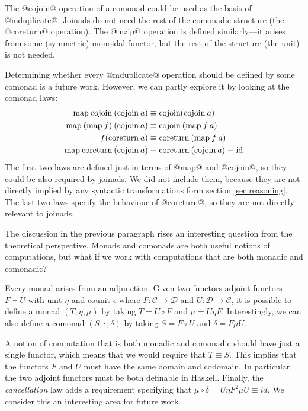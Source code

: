 \documentclass[preprint]{sigplanconf}
\begin{document}
The @cojoin@ operation of a comonad could be used as the basis of @mduplicate@. Joinads do not 
need the rest of the comonadic structure (the @coreturn@ operation). The @mzip@ operation is 
defined similarly---it arises from some (symmetric) monoidal functor, but the rest of the structure 
(the unit) is not needed. 

Determining whether every @mduplicate@ operation should be defined by some comonad is a future
work. However, we can partly explore it by looking at the comonad laws:
\begin{align*}
\text{map} \: \text{cojoin} \: (\text{cojoin} \: a) &\equiv \text{cojoin} (\text{cojoin} \: a)\\
\text{map} \: (\text{map} \: f) \: (\text{cojoin} \: a) &\equiv \text{cojoin} \: (\text{map} \: f \: a)\\
f (\text{coreturn} \: a) &\equiv \text{coreturn} \: (\text{map} \: f \: a)\\
\text{map} \: \text{coreturn} \: (\text{cojoin} \: a) &\equiv \text{coreturn} \: (\text{cojoin} \: a) \equiv \text{id}
\end{align*}
The first two laws are defined just in terms of @map@ and @cojoin@, so they could be also required 
by joinads. We did not include them, because they are not directly implied by any syntactic 
transformations form section \ref{sec:reasoning}. The last two laws specify the behaviour of 
@coreturn@, so they are not directly relevant to joinads.

The discussion in the previous paragraph rises an interesting question from the theoretical 
perspective. Monads and comonads are both useful notions of computations, but what if we work
with computations that are both monadic and comonadic?

Every monad arises from an adjunction. Given two functors adjoint functors 
$F \dashv U$ with unit $\eta$ and counit $\epsilon$ where $F : \mathcal{C} \rightarrow \mathcal{D}$ 
and $U : \mathcal{D} \rightarrow \mathcal{C}$, it is possible to define a monad $(T, \eta, \mu)$
by taking $T = U \circ F$ and $\mu = U \eta F$. Interestingly, we can also define a comonad 
$(S, \epsilon, \delta)$ by taking $S = F \circ U$ and $\delta = F \mu U$.

A notion of computation that is both monadic and comonadic should have just a single functor,
which means that we would require that $T \equiv S$. This implies that the functors $F$ and $U$ must 
have the same domain and codomain. In particular, the two adjoint functors must be both definable
in Haskell. Finally, the \textit{cancellation} law adds a requirement specifying that 
$\mu \circ \delta = U \eta F^2 \mu U\equiv \textit{id}$. We consider this an interesting area
for future work.
\end{document}
